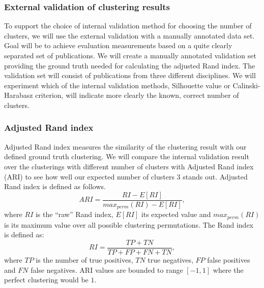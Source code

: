 \subsubsection{External validation of clustering results}
\label{sec:ext_val}
To support the choice of internal validation method for choosing
the number of clusters, we will use the external validation 
with a manually annotated data set. 
Goal will be to achieve evaluation measurements based on a quite 
clearly separated set of publications. 
We will create a manually annotated validation set providing the
ground truth needed for calculating the adjusted Rand index.
The validation set will consist of publications from three different
disciplines. We will experiment which of the internal validation
methods, Silhouette value or Calinski-Harabasz criterion, will
indicate more clearly the known, correct number of clusters.

\subsubsection{Adjusted Rand index}
Adjusted Rand index measures the similarity of the clustering result
with our defined ground truth clustering. We will compare the 
internal validation result over the clusterings with different number 
of clusters with Adjusted Rand index (ARI) 
\cite{hubert_comparing_1985} to see how well our expected number 
of clusters $3$ stands out. Adjusted Rand index is defined as 
follows.
\begin{equation}
 ARI = \frac{RI - E[RI]}{max_{perm}(RI) - E[RI]},
\end{equation}
where $RI$ is the ``raw'' Rand index, $E[RI]$ its expected value 
and $max_{perm}(RI)$ is its maximum value over all possible 
clustering permutations. The Rand index is defined as:
\begin{equation}
  RI = \frac{TP + TN}{TP + FP + FN + TN},
\end{equation}
where $TP$ is the number of true positives, $TN$ true negatives, 
$FP$ false positives and $FN$ false negatives. ARI values are 
bounded to range $[-1, 1]$ where the perfect clustering would 
be $1$.


